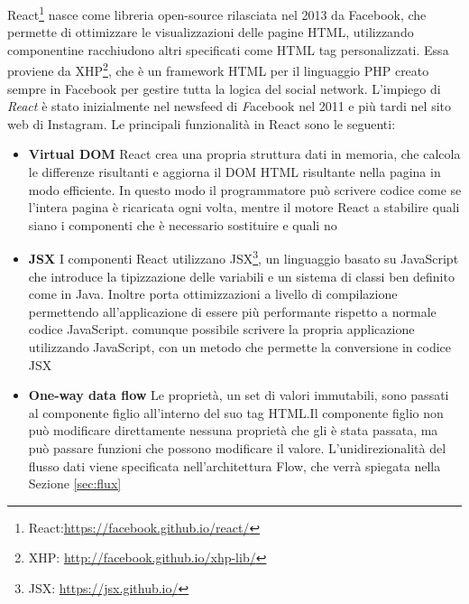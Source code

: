 React\footnote{React:\url{https://facebook.github.io/react/}} nasce come libreria open-source rilasciata nel 2013 da Facebook, che permette di ottimizzare le visualizzazioni delle pagine HTML, utilizzando componentine racchiudono altri specificati come HTML tag personalizzati.
Essa proviene da XHP\footnote{XHP: \url{http://facebook.github.io/xhp-lib/}}, che è un framework HTML per il linguaggio PHP creato sempre in Facebook per gestire tutta la logica del social network. L'impiego di \emph{React} è stato inizialmente nel newsfeed di \emph Facebook nel 2011 e più tardi nel sito web di Instagram.
Le principali funzionalità in React sono le seguenti:
\begin{itemize}
	\item \textbf{Virtual DOM}
	React crea una propria struttura dati in memoria, che calcola le differenze risultanti e aggiorna il DOM HTML risultante nella pagina in modo efficiente. In questo modo il programmatore può scrivere codice come se l'intera pagina è ricaricata ogni volta, mentre il motore React a stabilire quali siano i componenti che è necessario sostituire e quali no
	
	\item \textbf{JSX}
	I componenti React utilizzano JSX\footnote{JSX: \url{https://jsx.github.io/}}, un linguaggio basato su JavaScript che introduce la tipizzazione delle variabili e un sistema di classi ben definito come in Java. Inoltre porta ottimizzazioni a livello di compilazione permettendo all'applicazione di essere più performante rispetto a normale codice JavaScript. \upe comunque possibile scrivere la propria applicazione utilizzando JavaScript, con un metodo che permette la conversione in codice JSX
	
	\item \textbf{One-way data flow} Le proprietà, un set di valori immutabili, sono passati al componente figlio all'interno del suo tag HTML.Il componente figlio non può modificare direttamente nessuna proprietà che gli è stata passata, ma può passare funzioni che possono modificare il valore. 
	L'unidirezionalità del flusso dati viene specificata nell'architettura Flow, che verrà spiegata nella Sezione \ref{sec:flux}
\end{itemize}


